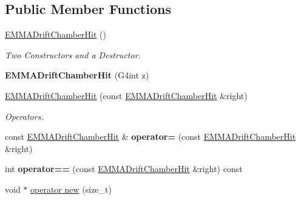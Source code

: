 \subsection*{Public Member Functions}
\begin{DoxyCompactItemize}
\item 
\hypertarget{classEMMADriftChamberHit_a594c8e260fee279b749157d4b9cf1ca5}{\hyperlink{classEMMADriftChamberHit_a594c8e260fee279b749157d4b9cf1ca5}{E\-M\-M\-A\-Drift\-Chamber\-Hit} ()}\label{classEMMADriftChamberHit_a594c8e260fee279b749157d4b9cf1ca5}

\begin{DoxyCompactList}\small\item\em Two Constructors and a Destructor. \end{DoxyCompactList}\item 
\hypertarget{classEMMADriftChamberHit_aaef952a2723be15703ead516c6ee1a7e}{{\bfseries E\-M\-M\-A\-Drift\-Chamber\-Hit} (G4int z)}\label{classEMMADriftChamberHit_aaef952a2723be15703ead516c6ee1a7e}

\item 
\hypertarget{classEMMADriftChamberHit_a336128054e27191099186780926d6961}{\hyperlink{classEMMADriftChamberHit_a336128054e27191099186780926d6961}{E\-M\-M\-A\-Drift\-Chamber\-Hit} (const \hyperlink{classEMMADriftChamberHit}{E\-M\-M\-A\-Drift\-Chamber\-Hit} \&right)}\label{classEMMADriftChamberHit_a336128054e27191099186780926d6961}

\begin{DoxyCompactList}\small\item\em Operators. \end{DoxyCompactList}\item 
\hypertarget{classEMMADriftChamberHit_a6cbcdf5f9534301edee59597856e10fc}{const \hyperlink{classEMMADriftChamberHit}{E\-M\-M\-A\-Drift\-Chamber\-Hit} \& {\bfseries operator=} (const \hyperlink{classEMMADriftChamberHit}{E\-M\-M\-A\-Drift\-Chamber\-Hit} \&right)}\label{classEMMADriftChamberHit_a6cbcdf5f9534301edee59597856e10fc}

\item 
\hypertarget{classEMMADriftChamberHit_a4c00fa9d1a0ea9237e9b1e94b3022e2b}{int {\bfseries operator==} (const \hyperlink{classEMMADriftChamberHit}{E\-M\-M\-A\-Drift\-Chamber\-Hit} \&right) const }\label{classEMMADriftChamberHit_a4c00fa9d1a0ea9237e9b1e94b3022e2b}

\item 
\hypertarget{classEMMADriftChamberHit_a9775aef5153605acf6b4ba1584e78b68}{void $\ast$ \hyperlink{classEMMADriftChamberHit_a9775aef5153605acf6b4ba1584e78b68}{operator new} (size\-\_\-t)}\label{classEMMADriftChamberHit_a9775aef5153605acf6b4ba1584e78b68}


\end{DoxyCompactItemize}
